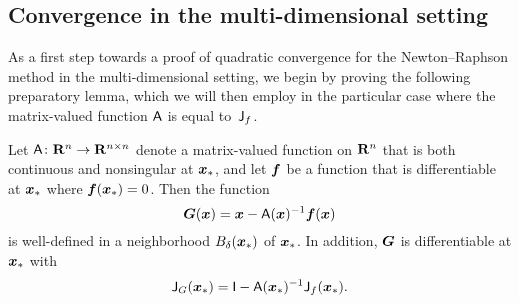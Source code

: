 \subsection*{Convergence in the multi-dimensional setting~\moreinfo}
As a first step towards a proof of quadratic convergence for the Newton--Raphson method in the multi-dimensional setting,
we begin by proving the following preparatory lemma,
which we will then employ in the particular case where the matrix-valued function $\mathsf A$ is equal to~$\mathsf J_f$.

\begin{lemma}
    \label{lemma:lemma_newton_raphson}
    Let $\mathsf A\colon \mathbf R^n \to \mathbf R^{n \times n}$ denote a matrix-valued function on $\mathbf R^n$ that is both continuous and nonsingular at $\mathbf{\boldsymbol{x}}_*$,
    and let $\mathbf{\boldsymbol{f}}$ be a function that is differentiable at $\mathbf{\boldsymbol{x}}_*$ where $\mathbf{\boldsymbol{f}}(\mathbf{\boldsymbol{x}}_*) = 0$.
    Then the function
    \[
        \mathbf{\boldsymbol{G}}(\mathbf{\boldsymbol{x}}) = \mathbf{\boldsymbol{x}} - \mathsf A(\mathbf{\boldsymbol{x}})^{-1} \mathbf{\boldsymbol{f}}(\mathbf{\boldsymbol{x}})
    \]
    is well-defined in a neighborhood $B_{\delta}(\mathbf{\boldsymbol{x}}_*)$ of $\mathbf{\boldsymbol{x}}_*$.
    In addition, $\mathbf{\boldsymbol{G}}$ is differentiable at $\mathbf{\boldsymbol{x}}_*$ with
    \begin{align}
        \label{eq:jacobian_G}
        \mathsf J_G(\mathbf{\boldsymbol{x}}_*) = \mathsf I - \mathsf A(\mathbf{\boldsymbol{x}}_*)^{-1} \mathsf J_f(\mathbf{\boldsymbol{x}}_*).
    \end{align}
\end{lemma}
